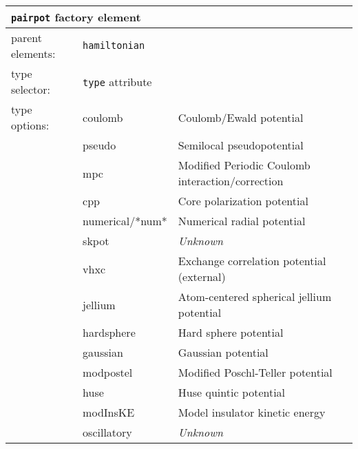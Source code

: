 \begin{table}[h]
\begin{center}
\begin{tabularx}{\textwidth}{l l l l l l }
\hline
\multicolumn{6}{l}{\texttt{pairpot} factory element} \\
\hline
\multicolumn{2}{l}{parent elements:} & \multicolumn{4}{l}{\texttt{hamiltonian}}\\
\multicolumn{2}{l}{type   selector:} & \multicolumn{4}{l}{\texttt{type} attribute}\\
\multicolumn{2}{l}{type   options: } & coulomb            & \multicolumn{3}{l}{Coulomb/Ewald potential}\\
\multicolumn{2}{l}{                } & pseudo             & \multicolumn{3}{l}{Semilocal pseudopotential}\\
\multicolumn{2}{l}{                } & mpc                & \multicolumn{3}{l}{Modified Periodic Coulomb interaction/correction}\\
\multicolumn{2}{l}{                } & cpp                & \multicolumn{3}{l}{Core polarization potential}\\
\multicolumn{2}{l}{                } & numerical/*num*    & \multicolumn{3}{l}{Numerical radial potential}\\
\multicolumn{2}{l}{                } & skpot              & \multicolumn{3}{l}{\textit{Unknown}}\\
\multicolumn{2}{l}{                } & vhxc               & \multicolumn{3}{l}{Exchange correlation potential (external)}\\
\multicolumn{2}{l}{                } & jellium            & \multicolumn{3}{l}{Atom-centered spherical jellium potential}\\
\multicolumn{2}{l}{                } & hardsphere         & \multicolumn{3}{l}{Hard sphere potential}\\
\multicolumn{2}{l}{                } & gaussian           & \multicolumn{3}{l}{Gaussian potential}\\
\multicolumn{2}{l}{                } & modpostel          & \multicolumn{3}{l}{Modified Poschl-Teller potential}\\
\multicolumn{2}{l}{                } & huse               & \multicolumn{3}{l}{Huse quintic potential}\\
\multicolumn{2}{l}{                } & modInsKE           & \multicolumn{3}{l}{Model insulator kinetic energy}\\
\multicolumn{2}{l}{                } & oscillatory        & \multicolumn{3}{l}{\textit{Unknown}}\\

\end{tabularx}
\end{center}
\end{table}
